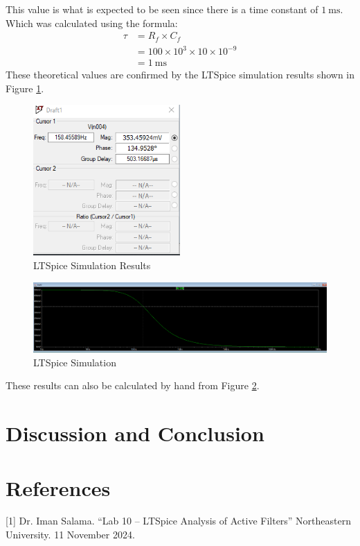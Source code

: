 \documentclass[12pt]{article}
\begin{document}
This value is what is expected to be seen since there is a time constant of
$\SI{1}{\milli\second}$. Which was calculated using the formula:
\[
	\begin{aligned}
		\tau & = R_f \times C_f \\
		     & = 100 \times 10^3 \times 10 \times 10^{-9} \\
		     & = \SI{1}{\milli\second}
	\end{aligned}
\]
These theoretical values are confirmed by the LTSpice simulation results shown in Figure \ref{fig:1.2Results}.
\begin{figure}[H]
	\centering
	\includegraphics[width=0.5\textwidth]{Lab 10 Shared/1.2 simulation results.PNG}
	\caption{LTSpice Simulation Results}
	\label{fig:1.2Results}
\end{figure}

\begin{figure}[H]
	\centering
	\includegraphics[width=1\textwidth]{Lab 10 Shared/1.2 simulation.PNG}
	\caption{LTSpice Simulation}
	\label{fig:1.2Simulation}
\end{figure}
These results can also be calculated by hand from Figure \ref{fig:1.2Simulation}.



\section{Discussion and Conclusion}


\section{References}
 [1] Dr. Iman Salama. “Lab 10 – LTSpice Analysis of Active Filters” Northeastern University. 11 November 2024.
\end{document}
